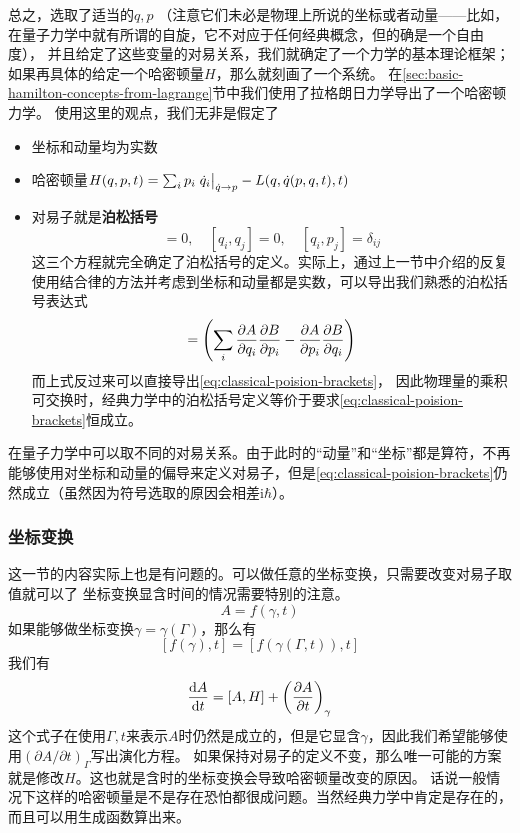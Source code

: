\documentclass[UTF8, a4paper]{ctexart}
\begin{document}
总之，选取了适当的$q,p$
（注意它们未必是物理上所说的坐标或者动量——比如，在量子力学中就有所谓的自旋，它不对应于任何经典概念，但的确是一个自由度），
并且给定了这些变量的对易关系，我们就确定了一个力学的基本理论框架；如果再具体的给定一个哈密顿量$H$，那么就刻画了一个系统。
在\ref{sec:basic-hamilton-concepts-from-lagrange}节中我们使用了拉格朗日力学导出了一个哈密顿力学。
使用这里的观点，我们无非是假定了
\begin{itemize}
    \item 坐标和动量均为实数
    \item 哈密顿量$H(q, p, t) = \sum_i p_i \eval{\dot{q}_i}_{\dot{q} \to p} - L(q, \dot{q}(p, q, t), t)$
    \item 对易子就是\textbf{泊松括号}
    \begin{equation}
        [p_i, p_j] = 0, \quad [q_i, q_j] = 0, \quad [q_i, p_j] = \delta_{ij}
        \label{eq:classical-poision-brackets}
    \end{equation}
    这三个方程就完全确定了泊松括号的定义。实际上，通过上一节中介绍的反复使用结合律的方法并考虑到坐标和动量都是实数，可以导出我们熟悉的泊松括号表达式
    \begin{equation}
        [A, B] = \left(\sum_i \pdv{A}{q_i} \pdv{B}{ p_i} - \pdv{A}{p_i} \pdv{B}{q_i}\right)
        \label{eq:classical-poison-brackets-def}
    \end{equation}
    而上式反过来可以直接导出\eqref{eq:classical-poision-brackets}，
    因此物理量的乘积可交换时，经典力学中的泊松括号定义等价于要求\eqref{eq:classical-poision-brackets}恒成立。
\end{itemize}
在量子力学中可以取不同的对易关系。由于此时的“动量”和“坐标”都是算符，不再能够使用对坐标和动量的偏导来定义对易子，但是\eqref{eq:classical-poision-brackets}仍然成立（虽然因为符号选取的原因会相差$\mathrm{i} \hbar$）。

\subsubsection{坐标变换}

这一节的内容实际上也是有问题的。可以做任意的坐标变换，只需要改变对易子取值就可以了
坐标变换显含时间的情况需要特别的注意。
\[
    A = f(\gamma, t)
\]
如果能够做坐标变换$\gamma=\gamma(\Gamma)$，那么有
\[
    [f(\gamma), t] = [f(\gamma(\Gamma, t)), t]
\]
我们有
\[
    \dv{A}{t} = [A, H] + \left( \pdv{A}{t} \right)_\gamma
\]
这个式子在使用$\Gamma, t$来表示$A$时仍然是成立的，但是它显含$\gamma$，因此我们希望能够使用$(\partial A / \partial t)_\Gamma$写出演化方程。
如果保持对易子的定义不变，那么唯一可能的方案就是修改$H$。这也就是含时的坐标变换会导致哈密顿量改变的原因。
话说一般情况下这样的哈密顿量是不是存在恐怕都很成问题。当然经典力学中肯定是存在的，而且可以用生成函数算出来。
\end{document}
